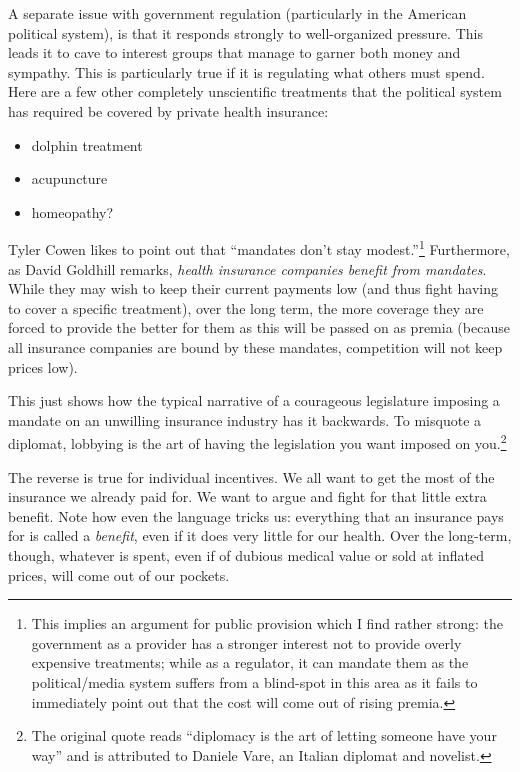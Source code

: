A separate issue with government regulation (particularly in the American
political system), is that it responds strongly to well-organized pressure.
This leads it to cave to interest groups that manage to garner both money and
sympathy. This is particularly true if it is regulating what others must spend.
Here are a few other completely unscientific treatments that the political
system has required be covered by private health insurance:

\begin{itemize}
\item dolphin treatment
\item acupuncture
\item homeopathy?
\end{itemize}

Tyler Cowen likes to point out that ``mandates don't stay
modest.''\footnote{This implies an argument for public provision which I find
rather strong: the government as a provider has a stronger interest not to
provide overly expensive treatments; while as a regulator, it can mandate them
as the political/media system suffers from a blind-spot in this area as it
fails to immediately point out that the cost will come out of rising premia.}
Furthermore, as David Goldhill remarks, \emph{health insurance companies
benefit from mandates}. While they may wish to keep their current payments low
(and thus fight having to cover a specific treatment), over the long term, the
more coverage they are forced to provide the better for them as this will be
passed on as premia (because all insurance companies are bound by these
mandates, competition will not keep prices low).

This just shows how the typical narrative of a courageous legislature imposing
a mandate on an unwilling insurance industry has it backwards. To misquote a
diplomat, lobbying is the art of having the legislation you want imposed on
you.\footnote{The original quote reads ``diplomacy is the art of letting
someone have your way'' and is attributed to Daniele Vare, an Italian diplomat
and novelist.}

The reverse is true for individual incentives. We all want to get the most of
the insurance we already paid for. We want to argue and fight for that little
extra benefit. Note how even the language tricks us: everything that an
insurance pays for is called a \emph{benefit}, even if it does very little for
our health. Over the long-term, though, whatever is spent, even if of dubious
medical value or sold at inflated prices, will come out of our pockets.

